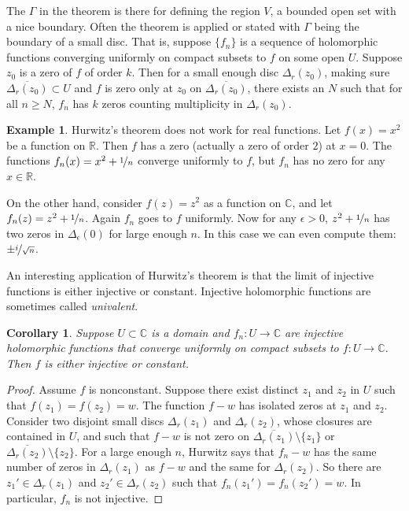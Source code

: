 \documentclass[12pt,openany]{book}
\newcommand{\C}{{\mathbb{C}}}
\newcommand{\R}{{\mathbb{R}}}
\newcommand{\myindex}[1]{#1\index{#1}}
\theoremstyle{plain}
\newtheorem{cor}[thm]{Corollary}
\theoremstyle{remark}
\theoremstyle{definition}
\theoremstyle{exercise}
\theoremstyle{example}
\newtheorem{example}[thm]{Example}
\begin{document}
The $\Gamma$ in the theorem is there for defining the region
$V$, a bounded open set with a nice boundary.
Often the theorem is applied or stated with $\Gamma$ being
the boundary of a small disc.
That is, suppose $\{ f_n \}$ is a sequence of holomorphic
functions converging uniformly
on compact subsets to $f$ on some open $U$.  Suppose $z_0$ is a zero of
$f$ of order $k$.  Then for a small enough disc $\Delta_r(z_0)$,
making sure $\overline{\Delta_r(z_0)} \subset U$ and
$f$ is zero only at $z_0$ on $\overline{\Delta_r(z_0)}$,
there exists an $N$ such that
for all $n \geq N$, $f_n$ has $k$ zeros counting multiplicity in
$\Delta_r(z_0)$.

\begin{example}
Hurwitz's theorem does not work for real functions.  Let $f(x) =
x^2$ be a function on $\R$.  Then $f$ has a zero (actually a zero of order $2$)
at $x=0$.  The functions $f_n(x) = x^2+\nicefrac{1}{n}$ converge uniformly
to $f$, but $f_n$ has no zero for any $x \in \R$.

On the other hand, consider $f(z) = z^2$ as a function on $\C$, and let
$f_n(z) = z^2+\nicefrac{1}{n}$.  Again $f_n$ goes to $f$ uniformly.  Now for
any $\epsilon > 0$, $z^2+\nicefrac{1}{n}$ has
two zeros in $\Delta_\epsilon(0)$ for large enough $n$.  In this case we can even compute
them: $\pm \nicefrac{i}{\sqrt{n}}$.
\end{example}

An interesting application of Hurwitz's theorem is that the limit of
injective functions is either injective or constant.
Injective holomorphic
functions are sometimes called \emph{\myindex{univalent}}.

\begin{cor} \label{cor:univalentlimit}
Suppose $U \subset \C$ is a domain and $f_n \colon U \to \C$ are
injective holomorphic functions that converge uniformly on compact subsets
to $f \colon U \to \C$.  Then $f$ is either injective or constant.
\end{cor}

\begin{proof}
Assume $f$ is nonconstant.
Suppose there exist distinct $z_1$ and $z_2$ in $U$ such that $f(z_1) =
f(z_2) = w$.  The function $f-w$ has isolated zeros at $z_1$ and $z_2$.
Consider two disjoint small discs $\Delta_r(z_1)$ and $\Delta_r(z_2)$,
whose closures are contained in $U$,
and such that $f-w$ is not zero on
$\overline{\Delta_r(z_1)} \setminus \{ z_1 \}$ or
$\overline{\Delta_r(z_2)} \setminus \{ z_2 \}$.
For a large enough $n$, Hurwitz says that $f_n-w$ has the same number of
zeros in $\Delta_r(z_1)$ as $f-w$ and the same for $\Delta_r(z_2)$.
So there are $z_1' \in \Delta_r(z_1)$ and
$z_2' \in \Delta_r(z_2)$ such that $f_n(z_1')=f_n(z_2')=w$.
In particular, $f_n$ is not injective.
\end{proof}
\end{document}
